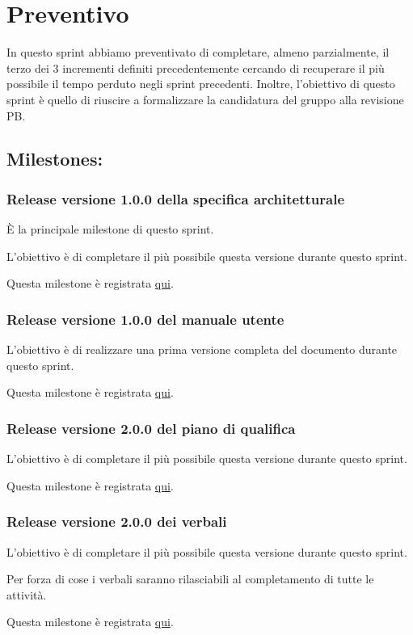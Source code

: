 \section{Preventivo}

In questo sprint abbiamo preventivato di completare, almeno parzialmente, il terzo dei 3 incrementi definiti precedentemente cercando di recuperare il più possibile il tempo perduto negli sprint precedenti. Inoltre, l'obiettivo di questo sprint è quello di riuscire a formalizzare la candidatura del gruppo alla revisione PB.

\subsection{Milestones:}  

\subsubsection{Release versione 1.0.0 della specifica architetturale}

È la principale milestone di questo sprint.

L'obiettivo è di completare il più possibile questa versione durante questo sprint.

Questa milestone è registrata \href{https://github.com/SWEasabi/specifica-architetturale/milestone/1}{qui}.

\subsubsection{Release versione 1.0.0 del manuale utente}

L'obiettivo è di realizzare una prima versione completa del documento durante questo sprint.

Questa milestone è registrata \href{https://github.com/SWEasabi/manuale-utente/milestone/1}{qui}.

\subsubsection{Release versione 2.0.0 del piano di qualifica}

L'obiettivo è di completare il più possibile questa versione durante questo sprint.

Questa milestone è registrata \href{https://github.com/SWEasabi/piano-di-qualifica/milestone/3}{qui}.

\subsubsection{Release versione 2.0.0 dei verbali}

L'obiettivo è di completare il più possibile questa versione durante questo sprint.

Per forza di cose i verbali saranno rilasciabili al completamento di tutte le attività.

Questa milestone è registrata \href{https://github.com/SWEasabi/verbali/milestone/1}{qui}.